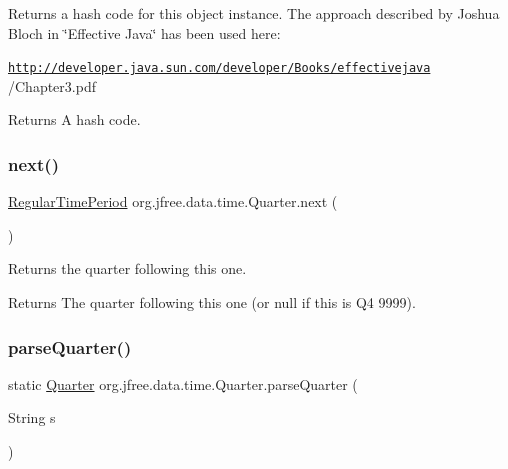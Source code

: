 Returns a hash code for this object instance. The approach described by Joshua Bloch in \char`\"{}\+Effective Java\char`\"{} has been used here\+: 

{\ttfamily \href{http://developer.java.sun.com/developer/Books/effectivejava}{\tt http\+://developer.\+java.\+sun.\+com/developer/\+Books/effectivejava} /\+Chapter3.pdf}

\begin{DoxyReturn}{Returns}
A hash code. 
\end{DoxyReturn}
\mbox{\label{classorg_1_1jfree_1_1data_1_1time_1_1_quarter_af173815c67598c0c4e8f12c3b180283d}} 
\subsubsection{\texorpdfstring{next()}{next()}}
{\footnotesize\ttfamily \mbox{\hyperlink{classorg_1_1jfree_1_1data_1_1time_1_1_regular_time_period}{Regular\+Time\+Period}} org.\+jfree.\+data.\+time.\+Quarter.\+next (\begin{DoxyParamCaption}{ }\end{DoxyParamCaption})}

Returns the quarter following this one.

\begin{DoxyReturn}{Returns}
The quarter following this one (or null if this is Q4 9999). 
\end{DoxyReturn}
\mbox{\label{classorg_1_1jfree_1_1data_1_1time_1_1_quarter_a6f39909ecee3a8b8fdcb2740ec8f06bc}} 
\subsubsection{\texorpdfstring{parse\+Quarter()}{parseQuarter()}}
{\footnotesize\ttfamily static \mbox{\hyperlink{classorg_1_1jfree_1_1data_1_1time_1_1_quarter}{Quarter}} org.\+jfree.\+data.\+time.\+Quarter.\+parse\+Quarter (\begin{DoxyParamCaption}\item[{String}]{s }\end{DoxyParamCaption})\hspace{0.3cm}{\ttfamily [static]}}

